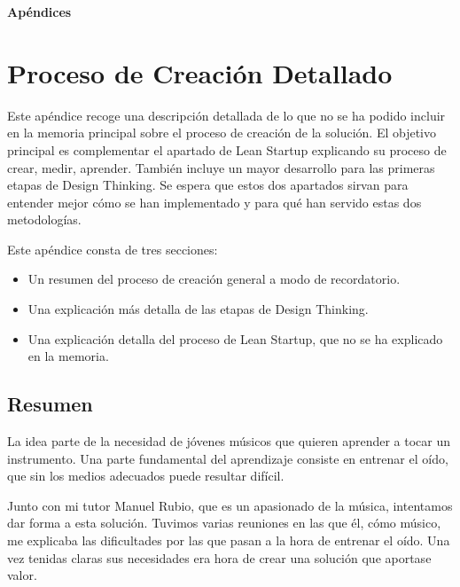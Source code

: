 \documentclass[12pt,twoside,titlepage]{report}
\begin{document}

\appendix
{}
{}
\mbox{}
\vfill
\begin{center}
\begin{Huge}
\textbf{Apéndices}
\end{Huge}
\end{center}
\vfill
\mbox{}
\thispagestyle{empty}
\newpage
\mbox{}
\thispagestyle{empty}
\newpage

\chapter{Proceso de Creación Detallado}
\label{sec:apendices}

Este apéndice recoge una descripción detallada de lo que no se ha podido incluir en la memoria principal sobre el proceso de creación de la solución. El objetivo principal es complementar el apartado de Lean Startup explicando su proceso de crear, medir, aprender. También incluye un mayor desarrollo para las primeras etapas de Design Thinking. Se espera que estos dos apartados sirvan para entender mejor cómo se han implementado y para qué han servido estas dos metodologías. 

Este apéndice consta de tres secciones:

\begin{itemize}
    \item Un resumen del proceso de creación general a modo de recordatorio.
    \item Una explicación más detalla de las etapas de Design Thinking.
    \item Una explicación detalla del proceso de Lean Startup, que no se ha explicado en la memoria.
\end{itemize}

\section{Resumen}
La idea parte de la necesidad de jóvenes músicos que quieren aprender a tocar un instrumento. Una parte fundamental del aprendizaje consiste en entrenar el oído, que sin los medios adecuados puede resultar difícil.

Junto con mi tutor Manuel Rubio, que es un apasionado de la música, intentamos dar forma a esta solución. Tuvimos varias reuniones en las que él, cómo músico, me explicaba las dificultades por las que pasan a la hora de entrenar el oído. Una vez tenidas claras sus necesidades era hora de crear una solución que aportase valor.
\end{document}
